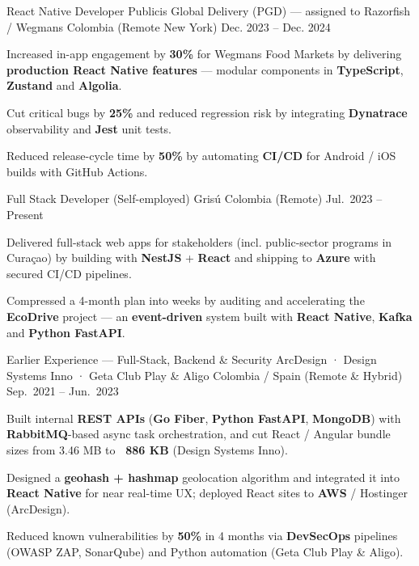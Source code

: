\begin{cventries}
  \cventry
  {React Native Developer}
  {Publicis Global Delivery (PGD) — assigned to Razorfish / Wegmans}
  {Colombia (Remote \textemdash{} New York)}
  {Dec. 2023 -- Dec. 2024}
  {
    \begin{cvitems}
      \item {Increased in-app engagement by \textbf{30\%} for Wegmans Food Markets by delivering \textbf{production React Native features} --- modular components in \textbf{TypeScript}, \textbf{Zustand} and \textbf{Algolia}.}
      \item {Cut critical bugs by \textbf{25\%} and reduced regression risk by integrating \textbf{Dynatrace} observability and \textbf{Jest} unit tests.}
      \item {Reduced release-cycle time by \textbf{50\%} by automating \textbf{CI/CD} for Android / iOS builds with GitHub Actions.}
    \end{cvitems}
  }

  \cventry
  {Full Stack Developer (Self-employed)}
  {Grisú}
  {Colombia (Remote)}
  {Jul.\ 2023 -- Present}
  {
    \begin{cvitems}
      \item {Delivered full-stack web apps for stakeholders (incl. public-sector programs in Curaçao) by building with \textbf{NestJS} + \textbf{React} and shipping to \textbf{Azure} with secured CI/CD pipelines.}
      \item {Compressed a 4-month plan into weeks by auditing and accelerating the \textbf{EcoDrive} project --- an \textbf{event-driven} system built with \textbf{React Native}, \textbf{Kafka} and \textbf{Python FastAPI}.}
    \end{cvitems}
  }

  \cventry
  {Earlier Experience --- Full-Stack, Backend \& Security}
  {ArcDesign · Design Systems Inno · Geta Club Play \& Aligo}
  {Colombia / Spain (Remote \& Hybrid)}
  {Sep.\ 2021 -- Jun.\ 2023}
  {
    \begin{cvitems}
      \item {Built internal \textbf{REST APIs} (\textbf{Go Fiber}, \textbf{Python FastAPI}, \textbf{MongoDB}) with \textbf{RabbitMQ}-based async task orchestration, and cut React / Angular bundle sizes from 3.46 MB to \textbf{~886 KB} (Design Systems Inno).}
      \item {Designed a \textbf{geohash + hashmap} geolocation algorithm and integrated it into \textbf{React Native} for near real-time UX; deployed React sites to \textbf{AWS} / Hostinger (ArcDesign).}
      \item {Reduced known vulnerabilities by \textbf{50\%} in 4 months via \textbf{DevSecOps} pipelines (OWASP ZAP, SonarQube) and Python automation (Geta Club Play \& Aligo).}
    \end{cvitems}
  }

\end{cventries}
